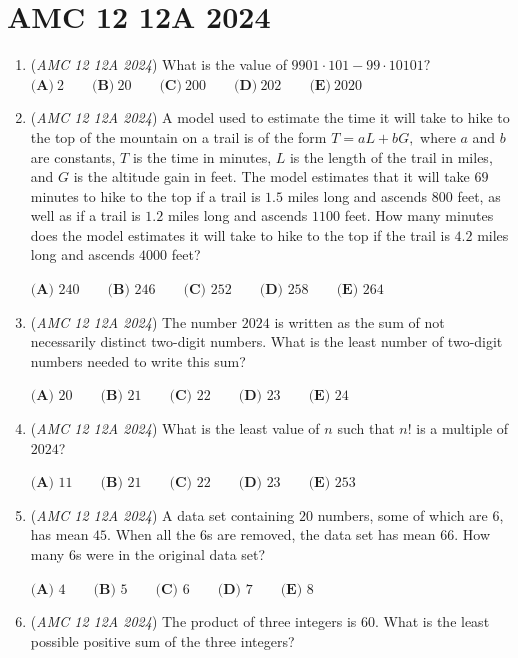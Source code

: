 \section{AMC 12 12A 2024}
        \begin{enumerate}
        	\item (\textit{AMC 12 12A 2024}) What is the value of $9901\cdot101-99\cdot10101?$
$\textbf{(A)}~2\qquad\textbf{(B)}~20\qquad\textbf{(C)}~200\qquad\textbf{(D)}~202\qquad\textbf{(E)}~2020$


	\item (\textit{AMC 12 12A 2024}) A model used to estimate the time it will take to hike to the top of the mountain on a trail is of the form $T=aL+bG,$ where $a$ and $b$ are constants, $T$ is the time in minutes, $L$ is the length of the trail in miles, and $G$ is the altitude gain in feet. The model estimates that it will take $69$ minutes to hike to the top if a trail is $1.5$ miles long and ascends $800$ feet, as well as if a trail is $1.2$ miles long and ascends $1100$ feet. How many minutes does the model estimates it will take to hike to the top if the trail is $4.2$ miles long and ascends $4000$ feet?


 $\textbf{(A) }240\qquad\textbf{(B) }246\qquad\textbf{(C) }252\qquad\textbf{(D) }258\qquad\textbf{(E) }264$


	\item (\textit{AMC 12 12A 2024}) The number $2024$ is written as the sum of not necessarily distinct two-digit numbers. What is the least number of two-digit numbers needed to write this sum?


 $\textbf{(A) }20\qquad\textbf{(B) }21\qquad\textbf{(C) }22\qquad\textbf{(D) }23\qquad\textbf{(E) }24$


	\item (\textit{AMC 12 12A 2024}) What is the least value of $n$ such that $n!$ is a multiple of $2024$?


 $\textbf{(A) }11 \qquad \textbf{(B) }21 \qquad \textbf{(C) }22 \qquad \textbf{(D) }23 \qquad \textbf{(E) }253 \qquad$


	\item (\textit{AMC 12 12A 2024}) A data set containing $20$ numbers, some of which are $6$, has mean $45$. When all the 6s are removed, the data set has mean $66$. How many 6s were in the original data set?


 $\textbf{(A) }4\qquad\textbf{(B) }5\qquad\textbf{(C) }6\qquad\textbf{(D) }7\qquad\textbf{(E) }8$


	\item (\textit{AMC 12 12A 2024}) The product of three integers is $60$. What is the least possible positive sum of the three integers?



\end{enumerate}
